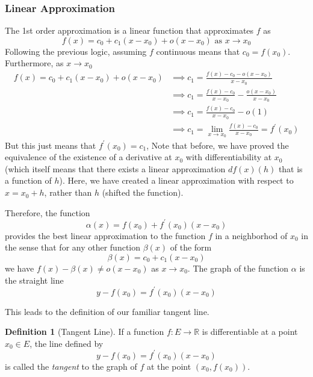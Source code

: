 \documentclass{article}
\theoremstyle{remark}
\theoremstyle{definition}
\newtheorem{definition}{Definition}[section]
\begin{document}
\subsubsection{Linear Approximation}
The 1st order approximation is a linear function that approximates $f$ as
\[f(x) = c_0 + c_1(x - x_0) + o(x - x_0) \text{ as } x \rightarrow x_0\]
Following the previous logic, assuming $f$ continuous means that $c_0 = f(x_0)$. Furthermore, as $x \rightarrow x_0$
\begin{align*}
    f(x) = c_0 + c_1(x - x_0) + o(x - x_0) & \implies c_1 = \frac{f(x) - c_0 - o(x - x_0)}{x - x_0} \\
    & \implies c_1 = \frac{f(x) - c_0}{x - x_0} - \frac{o(x - x_0)}{x - x_0}\\
    & \implies c_1 = \frac{f(x) - c_0}{x - x_0} - o(1) \\
    & \implies c_1 = \lim_{x \rightarrow x_0} \frac{f(x) - c_0}{x - x_0} = f^\prime (x_0)
\end{align*}
But this just means that $f^\prime (x_0) = c_1$, Note that before, we have proved the equivalence of the existence of a derivative at $x_0$ with differentiability at $x_0$ (which itself means that there exists a linear approximation $df(x)(h)$ that is a function of $h$). Here, we have created a linear approximation with respect to $x = x_0 + h$, rather than $h$ (shifted the function). 

Therefore, the function 
\[\alpha (x) = f(x_0) + f^\prime (x_0) (x - x_0)\]
provides the best linear approximation to the function $f$ in a neighborhod of $x_0$ in the sense that for any other function $\beta(x)$ of the form 
\[\beta(x) = c_0 + c_1 (x - x_0)\]
we have $f(x) - \beta(x) \neq o(x - x_0)$ as $x \rightarrow x_0$. The graph of the function $\alpha$ is the straight line
\[y - f(x_0) = f^\prime (x_0) (x - x_0)\]

This leads to the definition of our familiar tangent line. 

\begin{definition}[Tangent Line]
If a function $f: E \longrightarrow \mathbb{R}$ is differentiable at a point $x_0 \in E$, the line defined by
\[y - f(x_0) = f^\prime (x_0) (x - x_0)\]
is called the \textit{tangent} to the graph of $f$ at the point $(x_0, f(x_0))$. 
\end{definition}
\end{document}
